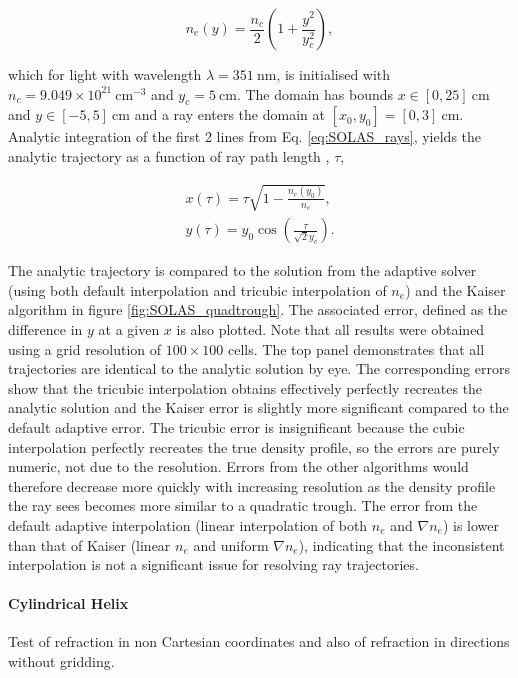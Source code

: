 \begin{equation}
    n_e(y) = \frac{n_c}{2} \left( 1 + \frac{y^2}{y_c^2} \right),
\end{equation}

which for light with wavelength $\lambda=351\ \text{nm}$, is initialised with $n_c = 9.049\times 10^{21} \ \text{cm}^{-3}$ and $y_c = 5 \ \text{cm}$.
The domain has bounds $x \in [0,25]\ \text{cm}$ and $y \in [-5,5]\ \text{cm}$ and a ray enters the domain at $[x_0,y_0]=[0,3]\ \text{cm}$.
Analytic integration of the first 2 lines from Eq. \ref{eq:SOLAS_rays}, yields the analytic trajectory as a function of ray path length , $\tau$,

\begin{equation}
    \begin{gathered}
        x(\tau) = \tau\sqrt{1-\frac{n_e(y_0)}{n_c}}, \\
        y(\tau) = y_0\cos{\left( \frac{\tau}{\sqrt{2}y_c} \right)}.
    \end{gathered}
\end{equation}

The analytic trajectory is compared to the solution from the adaptive solver (using both default interpolation and tricubic interpolation of $n_e$) and the Kaiser algorithm in figure \ref{fig:SOLAS_quadtrough}.
The associated error, defined as the difference in $y$ at a given $x$ is also plotted.
Note that all results were obtained using a grid resolution of $100\times100$ cells.
The top panel demonstrates that all trajectories are identical to the analytic solution by eye.
The corresponding errors show that the tricubic interpolation obtains effectively perfectly recreates the analytic solution and the Kaiser error is slightly more significant compared to the default adaptive error.
The tricubic error is insignificant because the cubic interpolation perfectly recreates the true density profile, so the errors are purely numeric, not due to the resolution.
Errors from the other algorithms would therefore decrease more quickly with increasing resolution as the density profile the ray sees becomes more similar to a quadratic trough.
The error from the default adaptive interpolation (linear interpolation of both $n_e$ and $\nabla n_e$) is lower than that of Kaiser (linear $n_e$ and uniform $\nabla n_e$), indicating that the inconsistent interpolation is not a significant issue for resolving ray trajectories.

\paragraph*{Cylindrical Helix}
Test of refraction in non Cartesian coordinates and also of refraction in directions without gridding.

